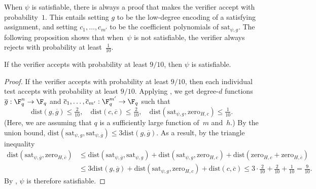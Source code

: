 \documentclass[11pt]{article}
\begin{document}
When $\psi$ is satisfiable, there is always a proof that makes the verifier accept with probability~$1$.
This entails setting $g$ to be the low-degree encoding of a satisfying assignment,
and setting $c_1, \ldots, c_{m'}$ to be the coefficient polynomials of $\mathrm{sat}_{\psi,g}$.
The following proposition shows that when~$\psi$ is not satisfiable, the verifier always rejects with probability at least~$\tfrac{1}{10}$.
\begin{proposition}
If the verifier accepts with probability at least $9/10$, then $\psi$ is satisfiable.
\end{proposition}
\begin{proof}
If the verifier accepts with probability at least $9/10$,
then each individual test accepts with probability at least $9/10$.
Applying ,
we get degree-$d$ functions $\overline{g}:\F_q^n \rightarrow \F_q$ and $\overline{c}_1, \ldots, \overline{c}_{m'}:\F_q^{m'} \rightarrow \F_q$
such that
\begin{equation*}
\mathrm{dist}(g, \overline{g}) \leq \tfrac{2}{10}, \quad
\mathrm{dist}(c, \overline{c}) \leq \tfrac{2}{10}, \quad
\mathrm{dist}(\mathrm{sat}_{\psi,g}, \mathrm{zero}_{H,c}) \leq \tfrac{1}{10}.
\end{equation*}
(Here, we are assuming that $q$ is a sufficiently large function of~$m$ and~$h$.)
By the union bound, $\mathrm{dist}(\mathrm{sat}_{\psi,g}, \mathrm{sat}_{\psi,\overline{g}}) \leq 3\mathrm{dist}(g, \overline{g})$.
As a result, by the triangle inequality
\begin{align*}
\mathrm{dist}(\mathrm{sat}_{\psi,\overline{g}}, \mathrm{zero}_{H,\overline{c}})
&\leq \mathrm{dist}(\mathrm{sat}_{\psi,\overline{g}}, \mathrm{sat}_{\psi, g}) +
	\mathrm{dist}(\mathrm{sat}_{\psi, g}, \mathrm{zero}_{H,c})+
	\mathrm{dist}(\mathrm{zero}_{H,c} + \mathrm{zero}_{H,\overline{c}})\\
&\leq 3 \mathrm{dist}(g, \overline{g})+
	\mathrm{dist}(\mathrm{sat}_{\psi, g}, \mathrm{zero}_{H,c})+
	\mathrm{dist}(c, \overline{c}) \leq 3 \cdot \tfrac{2}{10} + \tfrac{2}{10} + \tfrac{1}{10} = \tfrac{9}{10}.
\end{align*}
By , $\psi$ is therefore satisfiable.
\end{proof}
\end{document}
